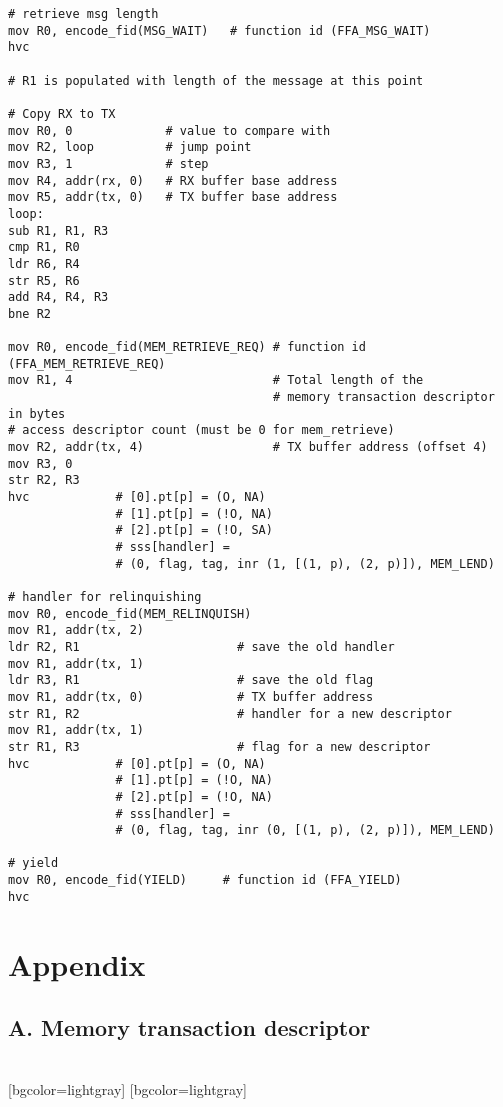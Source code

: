 \documentclass{article}
\begin{document}
\begin{lstlisting}[caption={VM 2}]
# retrieve msg length
mov R0, encode_fid(MSG_WAIT)   # function id (FFA_MSG_WAIT)
hvc

# R1 is populated with length of the message at this point

# Copy RX to TX
mov R0, 0             # value to compare with
mov R2, loop          # jump point
mov R3, 1             # step
mov R4, addr(rx, 0)   # RX buffer base address
mov R5, addr(tx, 0)   # TX buffer base address
loop:
sub R1, R1, R3
cmp R1, R0
ldr R6, R4
str R5, R6
add R4, R4, R3
bne R2

mov R0, encode_fid(MEM_RETRIEVE_REQ) # function id (FFA_MEM_RETRIEVE_REQ)
mov R1, 4                            # Total length of the  
                                     # memory transaction descriptor in bytes
# access descriptor count (must be 0 for mem_retrieve)
mov R2, addr(tx, 4)                  # TX buffer address (offset 4)
mov R3, 0
str R2, R3                                    
hvc            # [0].pt[p] = (O, NA)
               # [1].pt[p] = (!O, NA)
               # [2].pt[p] = (!O, SA)
               # sss[handler] = 
               # (0, flag, tag, inr (1, [(1, p), (2, p)]), MEM_LEND)

# handler for relinquishing
mov R0, encode_fid(MEM_RELINQUISH)
mov R1, addr(tx, 2)
ldr R2, R1                      # save the old handler
mov R1, addr(tx, 1)
ldr R3, R1                      # save the old flag
mov R1, addr(tx, 0)             # TX buffer address
str R1, R2                      # handler for a new descriptor
mov R1, addr(tx, 1)
str R1, R3                      # flag for a new descriptor
hvc            # [0].pt[p] = (O, NA)
               # [1].pt[p] = (!O, NA)
               # [2].pt[p] = (!O, NA)
               # sss[handler] = 
               # (0, flag, tag, inr (0, [(1, p), (2, p)]), MEM_LEND)

# yield
mov R0, encode_fid(YIELD)     # function id (FFA_YIELD)
hvc
\end{lstlisting}

\section*{Appendix}

\subsection*{A. Memory transaction descriptor}

\begin{bytefield}[bitwidth=1.4em]{32}
	\\
	[bgcolor=lightgray]{}
	[bgcolor=lightgray]{}
\end{bytefield}
\end{document}

